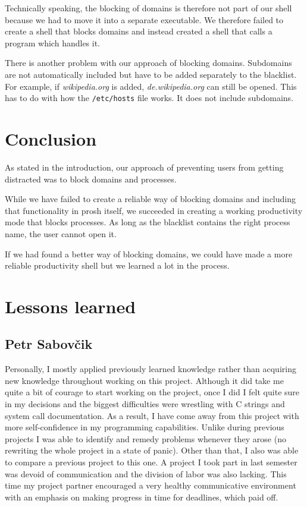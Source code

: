 \documentclass{article}
\begin{document}
Technically speaking, the blocking of domains is therefore not part of our shell because we had to move it into a separate executable. We therefore failed to create a shell that blocks domains and instead created a shell that calls a program which handles it.

There is another problem with our approach of blocking domains. Subdomains are not automatically included but have to be added separately to the blacklist. For example, if \textit{wikipedia.org} is added, \textit{de.wikipedia.org} can still be opened. This has to do with how the \texttt{/etc/hosts} file works. It does not include subdomains.

\section{Conclusion}

As stated in the introduction, our approach of preventing users from getting distracted was to block domains and processes.

While we have failed to create a reliable way of blocking domains and including that functionality in prosh itself, we succeeded in creating a working productivity mode that blocks processes. As long as the blacklist contains the right process name, the user cannot open it.

If we had found a better way of blocking domains, we could have made a more reliable productivity shell but we learned a lot in the process.

\section{Lessons learned}
\subsection{Petr Sabovčik}

Personally, I mostly applied previously learned knowledge rather than acquiring new knowledge throughout working on this project. Although it did take me quite a bit of courage to start working on the project, once I did I felt quite sure in my decisions and the biggest difficulties were wrestling with C strings and system call documentation. As a result, I have come away from this project with more self-confidence in my programming capabilities. Unlike during previous projects I was able to identify and remedy problems whenever they arose (no rewriting the whole project in a state of panic). Other than that, I also was able to compare a previous project to this one. A project I took part in last semester was devoid of communication and the division of labor was also lacking. This time my project partner encouraged a very healthy communicative environment with an emphasis on making progress in time for deadlines, which paid off.
\end{document}
